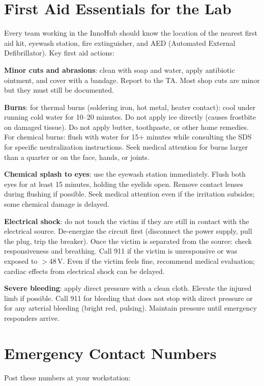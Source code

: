 \section{First Aid Essentials for the Lab}
Every team working in the InnoHub should know the location of the nearest first aid kit, eyewash station, fire extinguisher, and AED (Automated External Defibrillator). Key first aid actions:

\textbf{Minor cuts and abrasions}: clean with soap and water, apply antibiotic ointment, and cover with a bandage. Report to the TA. Most shop cuts are minor but they must still be documented.

\textbf{Burns}: for thermal burns (soldering iron, hot metal, heater contact): cool under running cold water for 10--20 minutes. Do not apply ice directly (causes frostbite on damaged tissue). Do not apply butter, toothpaste, or other home remedies. For chemical burns: flush with water for 15+ minutes while consulting the SDS for specific neutralization instructions. Seek medical attention for burns larger than a quarter or on the face, hands, or joints.

\textbf{Chemical splash to eyes}: use the eyewash station immediately. Flush both eyes for at least 15 minutes, holding the eyelids open. Remove contact lenses during flushing if possible. Seek medical attention even if the irritation subsides; some chemical damage is delayed.

\textbf{Electrical shock}: do not touch the victim if they are still in contact with the electrical source. De-energize the circuit first (disconnect the power supply, pull the plug, trip the breaker). Once the victim is separated from the source: check responsiveness and breathing. Call 911 if the victim is unresponsive or was exposed to $>$48\,V. Even if the victim feels fine, recommend medical evaluation; cardiac effects from electrical shock can be delayed.

\textbf{Severe bleeding}: apply direct pressure with a clean cloth. Elevate the injured limb if possible. Call 911 for bleeding that does not stop with direct pressure or for any arterial bleeding (bright red, pulsing). Maintain pressure until emergency responders arrive.

\section{Emergency Contact Numbers}
Post these numbers at your workstation:

